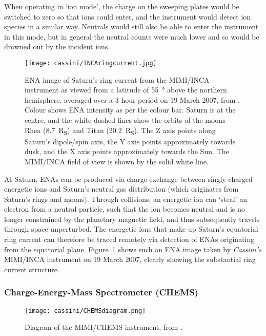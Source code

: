 When operating in `ion mode', the charge on the sweeping plates would be switched to zero so that ions could enter, and the instrument would detect ion species in a similar way. Neutrals would still also be able to enter the instrument in this mode, but in general the neutral counts were much lower and so would be drowned out by the incident ions.

\begin{figure}
\centering
\noindent\texttt{[image: cassini/INCAringcurrent.jpg]}
\caption[ENA image of Saturn's ring current from MIMI/INCA.]{ENA image of Saturn's ring current from the MIMI/INCA instrument as viewed from a latitude of \SI{55}{\degree} above the northern hemisphere, averaged over a 3 hour period on 19 March 2007, from \citet{nasa2007}. Colour shows ENA intensity as per the colour bar. Saturn is at the centre, and the white dashed lines show the orbits of the moons Rhea (\SI{8.7}{R_S}) and Titan (\SI{20.2}{R_S}). The Z axis points along Saturn's dipole/spin axis, the Y axis points approximately towards dusk, and the X axis points approximately towards the Sun. The MIMI/INCA field of view is shown by the solid white line.}
\label{cassini:fig:INCAringcurrent}
\end{figure}

At Saturn, ENAs can be produced via charge exchange between singly-charged energetic ions and Saturn's neutral gas distribution (which originates from Saturn's rings and moons). Through collisions, an energetic ion can `steal' an electron from a neutral particle, such that the ion becomes neutral and is no longer constrained by the planetary magnetic field, and thus subsequently travels through space unperturbed. The energetic ions that make up Saturn's equatorial ring current can therefore be traced remotely via detection of ENAs originating from the equatorial plane. Figure~\ref{cassini:fig:INCAringcurrent} shows such an ENA image taken by \textit{Cassini's} MIMI/INCA instrument on 19 March 2007, clearly showing the substantial ring current structure. 

\subsubsection{Charge-Energy-Mass Spectrometer (CHEMS)}
\begin{figure}
\centering
\noindent\texttt{[image: cassini/CHEMSdiagram.png]}
\caption[Diagram of the MIMI/CHEMS instrument.]{Diagram of the MIMI/CHEMS instrument, from \citet{krimigis2004}.}
\label{cassini:fig:CHEMSdiagram}
\end{figure}

